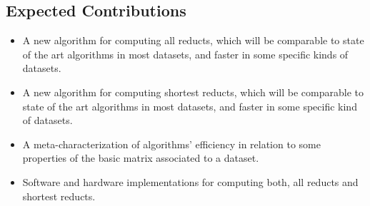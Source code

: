\documentclass[authoryear,11pt]{elsarticle}
\begin{document}
\subsection{Expected Contributions}\label{Contributions} 
  \begin{itemize}
  \item A new algorithm for computing all reducts, which will be comparable to 
  		state of the art algorithms in most datasets, and faster in some specific kinds of datasets.
  \item A new algorithm for computing shortest reducts, which will be comparable to 
  		state of the art algorithms in most datasets, and faster in some specific kind of datasets.
  \item A meta-characterization of algorithms' efficiency in relation to some properties of the
  		basic matrix associated to a dataset.
  \item Software and hardware implementations for computing both, all reducts and shortest reducts.
  \end{itemize}
\end{document}

